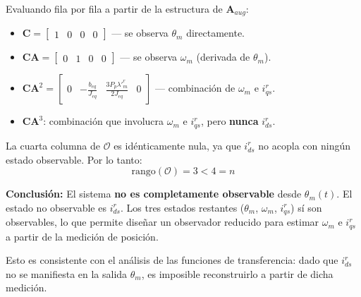 \documentclass[12pt, a4paper,journal, onecolumn, compsoc]{IEEEtran}
\begin{document}
Evaluando fila por fila a partir de la estructura de $\mathbf{A}_{aug}$:
\begin{itemize}
    \item $\mathbf{C} = \begin{bmatrix} 1 & 0 & 0 & 0 \end{bmatrix}$ --- se observa $\theta_m$ directamente.
    \item $\mathbf{C}\mathbf{A} = \begin{bmatrix} 0 & 1 & 0 & 0 \end{bmatrix}$ --- se observa $\omega_m$ (derivada de $\theta_m$).
    \item $\mathbf{C}\mathbf{A}^2 = \begin{bmatrix} 0 & -\frac{b_{eq}}{J_{eq}} & \frac{3P_p\lambda'^r_m}{2J_{eq}} & 0 \end{bmatrix}$ --- combinación de $\omega_m$ e $i_{qs}^r$.
    \item $\mathbf{C}\mathbf{A}^3$: combinación que involucra $\omega_m$ e $i_{qs}^r$, pero \textbf{nunca} $i_{ds}^r$.
\end{itemize}

La cuarta columna de $\mathcal{O}$ es idénticamente nula, ya que $i_{ds}^r$ no acopla con ningún estado observable. Por lo tanto:
\begin{equation}
    \text{rango}(\mathcal{O}) = 3 < 4 = n
\end{equation}

\textbf{Conclusión:} El sistema \textbf{no es completamente observable} desde $\theta_m(t)$. El estado no observable es $i_{ds}^r$. Los tres estados restantes ($\theta_m$, $\omega_m$, $i_{qs}^r$) sí son observables, lo que permite diseñar un observador reducido para estimar $\omega_m$ e $i_{qs}^r$ a partir de la medición de posición.

Esto es consistente con el análisis de las funciones de transferencia: dado que $i_{ds}^r$ no se manifiesta en la salida $\theta_m$, es imposible reconstruirlo a partir de dicha medición.
\end{document}
